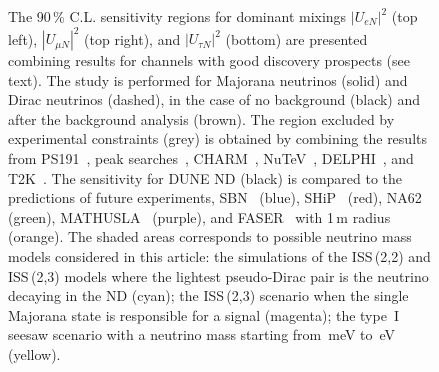 \begin{figure}
	\centering
	\noindent{}

	\vspace{0.5em}
	{\resizebox{0.5\linewidth}{!}{}}
	\vspace{-0.2em}
	\caption{The 90\,\% C.L. sensitivity regions for dominant mixings %
		$|U_{e N}|^2$ (top left), $|U_{\mu N}|^2$ (top right), and $|U_{\tau N}|^2$ (bottom) are presented %
		combining results for channels with good discovery prospects (see text).
		The study is performed for Majorana neutrinos (solid) and Dirac neutrinos (dashed), %
		in the case of no background (black) and after the background analysis (brown).
		The region excluded by experimental constraints (grey) is obtained by combining the results from
		PS191~\cite{Bernardi:1985ny, Bernardi:1987ek}, %
		peak searches~\cite{Artamonov:2014urb, Britton:1992pg, Britton:1992xv, Aguilar-Arevalo:2017vlf, Aguilar-Arevalo:2019owf}, %
		CHARM~\cite{Vilain:1994vg}, NuTeV~\cite{Vaitaitis:1999wq}, DELPHI~\cite{Abreu:1996pa}, and T2K~\cite{Abe:2019kgx}.
		The sensitivity for DUNE ND (black) is compared to the predictions of future experiments, %
		SBN~\cite{Ballett:2016opr} (blue), %
		SHiP~\cite{Alekhin:2015byh} (red), NA62~\cite{Drewes:2018irr} (green), MATHUSLA~\cite{Curtin:2018mvb} (purple), %
		and FASER~\cite{Kling:2018wct} with 1\,m radius (orange).
		The shaded areas corresponds to possible neutrino mass models considered in this article: %
		the simulations of the ISS\,(2,2) and ISS\,(2,3) models where the lightest %
		pseudo-Dirac pair is the neutrino decaying in the ND (cyan); %
		the ISS\,(2,3) scenario when the single Majorana state is responsible for a signal (magenta); %
		the type~I seesaw scenario with a neutrino mass starting from \,meV to \,eV (yellow).}
	\label{fig:sensAll}
\end{figure}

